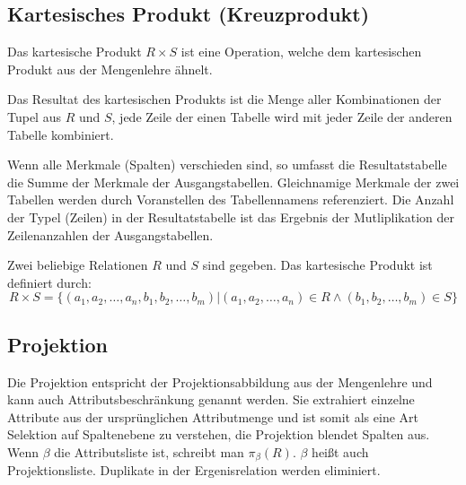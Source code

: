 \documentclass{scrbook}
\begin{document}
\subsection{Kartesisches Produkt (Kreuzprodukt)}

Das kartesische Produkt $R × S$ ist eine Operation,
welche dem kartesischen Produkt aus der Mengenlehre ähnelt.

Das Resultat des kartesischen Produkts ist die Menge aller Kombinationen der 
Tupel aus $R$ und $S$, jede Zeile der einen Tabelle wird mit jeder Zeile 
der anderen Tabelle kombiniert.

Wenn alle Merkmale (Spalten) verschieden sind, so umfasst die Resultatstabelle
die Summe der Merkmale der Ausgangstabellen.
Gleichnamige Merkmale der zwei Tabellen werden durch Voranstellen 
des Tabellennamens referenziert. Die Anzahl der Typel (Zeilen) 
in der Resultatstabelle ist das Ergebnis der Mutliplikation
der Zeilenanzahlen der Ausgangstabellen.

\begin{definition}
Zwei beliebige Relationen $R$ und $S$ sind gegeben.
Das kartesische Produkt ist definiert durch:
\begin{displaymath}
R × S = \{(a_1, a_2, \dots, a_n, b_1, b_2, \dots, b_m) | (a_1, a_2, \dots, a_n) ∈ R ∧ (b_1, b_2, \dots, b_m) ∈ S \}
\end{displaymath}
\end{definition}


% 
% 
% 
%


\subsection{Projektion}

Die Projektion entspricht der Projektionsabbildung aus der Mengenlehre
und kann auch Attributsbeschränkung genannt werden.
Sie extrahiert einzelne Attribute aus der ursprünglichen Attributmenge
und ist somit als eine Art Selektion auf Spaltenebene zu verstehen,
die Projektion blendet Spalten aus.
Wenn $β$ die Attributsliste ist, schreibt man $π_β(R)$. 
$β$ heißt auch Projektionsliste.
Duplikate in der Ergenisrelation werden eliminiert.
\end{document}
